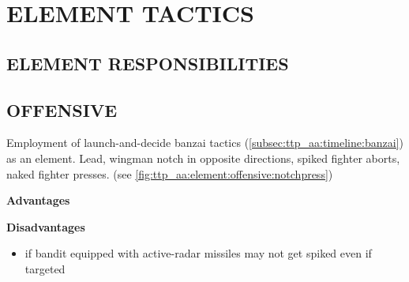 \section{ELEMENT TACTICS}

\begin{tcoloritemize}
    \blueitem[Element]
\end{tcoloritemize}

\subsection{ELEMENT RESPONSIBILITIES}

\begin{tcoloritemize}
    \blueitem[Lead]
    \blueitem[Wingman]
\end{tcoloritemize}

\subsection{OFFENSIVE}

\begin{tcoloritemize}
    Employment of launch-and-decide banzai tactics (\cref{subsec:ttp_aa:timeline:banzai})
    as an element. Lead, wingman notch in opposite directions, 
    spiked fighter aborts, 
    naked fighter presses.
    \hfill(see \cref{fig:ttp_aa:element:offensive:notchpress})

    \bigskip
    \textbf{Advantages}

    \bigskip
    \textbf{Disadvantages}
    \begin{itemize}
        \item if bandit equipped with active-radar missiles may not get spiked even if targeted
    \end{itemize}
\end{tcoloritemize}

